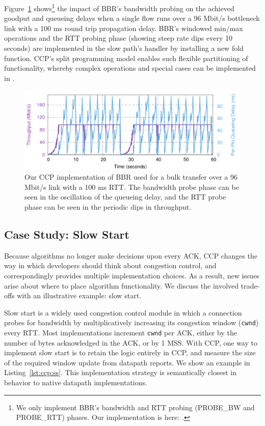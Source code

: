 Figure~\ref{fig:ccp:bbr} shows\footnote{We only implement BBR's bandwidth and RTT probing (PROBE\_BW and PROBE\_RTT) phases. Our implementation is here: .}
the impact of BBR's bandwidth probing on the
achieved goodput and queueing delays when a single flow runs over a 96 Mbit/s
bottleneck link with a 100 ms round trip propagation delay.
%
BBR's windowed min/max operations and the RTT probing phase (showing steep rate
dips every 10 seconds) are implemented in the slow path's 
handler by installing a new fold function.
%
CCP's split programming model enables such flexible partitioning of
functionality, whereby complex operations and special cases can be implemented
in \userspace.

\begin{figure}[t]
\centering
    \includegraphics[width=\columnwidth]{img/bbr}
    \caption{
    Our CCP implementation of BBR used for a bulk transfer over a 96 Mbit/s link with a 100 ms RTT. The bandwidth probe phase can be seen in the oscillation of the queueing delay, and the RTT probe phase can be seen in the periodic dips in throughput.
    }\label{fig:ccp:bbr}
\end{figure}

\subsection{Case Study: Slow Start}
\label{s:ccp:ss}

Because algorithms no longer make decisions upon every ACK, CCP changes the way in which developers should think about congestion control, and correspondingly provides multiple implementation choices. As a result, new issues arise about where to place algorithm functionality. We discuss the involved trade-offs with an illustrative example: slow start.

Slow start is a widely used congestion control module in which a connection probes for bandwidth by multiplicatively increasing its congestion window (\texttt{cwnd}) every RTT. Most implementations increment \texttt{cwnd} per ACK, either by the number of bytes acknowledged in the ACK, or by 1 MSS. With CCP, one way to implement slow start is to retain the logic entirely in CCP, and measure the size of the required window update from datapath reports. We show an example in Listing~\ref{lst:ccp:ss}. This implementation strategy is semantically closest in behavior to native datapath implementations.


